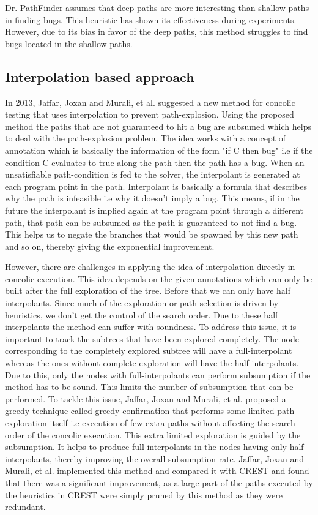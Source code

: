 \documentclass[ runningheads,
               a4paper]{llncs}
\begin{document}
Dr. PathFinder assumes that deep paths are more interesting than shallow paths in finding bugs. This heuristic has shown its effectiveness during experiments. However, due to its bias in favor of the deep paths, this method struggles to find bugs located in the shallow paths.




\subsection{Interpolation based approach}
In 2013, Jaffar, Joxan and Murali, et al. suggested a new method \cite{jaffar2013boosting} for concolic testing that uses interpolation to prevent path-explosion. Using the proposed method the paths that are not guaranteed to hit a bug are subsumed which helps to deal with the path-explosion problem. The idea works with a concept of annotation which is basically the  information of the form "if C then bug" i.e if the condition C evaluates to true along the path then the path has a bug. When an unsatisfiable path-condition is fed to the solver, the interpolant is generated at each program point in the path. Interpolant is basically a formula that describes why the path is infeasible i.e why it doesn't imply a bug. This means, if in the future the interpolant is implied again at the program point through a different path, that path can be subsumed as the path is guaranteed to not find a bug. This helps us to negate the branches that would be spawned by this new path and so on, thereby giving the exponential improvement.


However, there are challenges \cite{jaffar2013boosting} in applying the idea of interpolation directly in concolic execution. This idea depends on the given annotations which can only be built after the full exploration of the tree. Before that we can only have half interpolants. Since much of the exploration or path selection is driven by heuristics, we don't get the control of the search order. Due to these half interpolants the method can suffer with soundness. To address this issue, it is important to track the subtrees that have been explored completely. The node corresponding to the completely explored subtree will have a full-interpolant whereas the ones without complete exploration will have the half-interpolants. Due to this, only the nodes with full-interpolants can perform subsumption if the method has to be sound. This limits the number of subsumption that can be performed. To tackle this issue, Jaffar, Joxan and Murali, et al. \cite{jaffar2013boosting} proposed a greedy technique called greedy confirmation that performs some limited path exploration itself i.e execution of few extra paths without affecting the search order of the concolic execution. This extra limited exploration is guided by the subsumption. It helps to produce full-interpolants in the nodes having only half-interpolants, thereby improving the overall subsumption rate. Jaffar, Joxan and Murali, et al. \cite{jaffar2013boosting} implemented this method and compared it with CREST
\cite{kousik2008heuristic} and found that there was a significant improvement, as a large part of the paths executed by the heuristics in CREST were simply pruned by this method as they were redundant.
\end{document}
